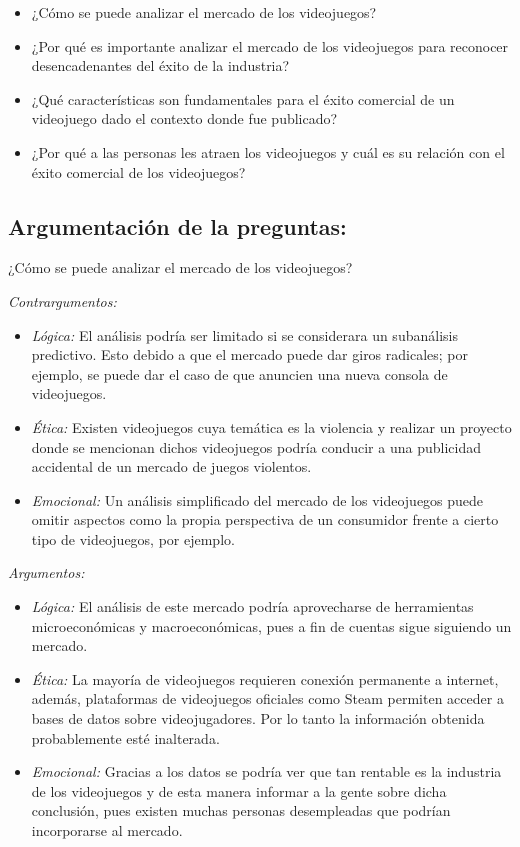 \documentclass[
  letterpaper,
  DIV=11,
  numbers=noendperiod]{scrreprt}
\begin{document}
\begin{itemize}
\item
  ¿Cómo se puede analizar el mercado de los videojuegos?
\item
  ¿Por qué es importante analizar el mercado de los videojuegos para
  reconocer desencadenantes del éxito de la industria?
\item
  ¿Qué características son fundamentales para el éxito comercial de un
  videojuego dado el contexto donde fue publicado?
\item
  ¿Por qué a las personas les atraen los videojuegos y cuál es su
  relación con el éxito comercial de los videojuegos?
\end{itemize}

\hypertarget{argumentaciuxf3n-de-la-preguntas}{%
\subsection{Argumentación de la
preguntas:}\label{argumentaciuxf3n-de-la-preguntas}}

¿Cómo se puede analizar el mercado de los videojuegos?

\emph{Contrargumentos:}

\begin{itemize}
\item
  \emph{Lógica:} El análisis podría ser limitado si se considerara un
  subanálisis predictivo. Esto debido a que el mercado puede dar giros
  radicales; por ejemplo, se puede dar el caso de que anuncien una nueva
  consola de videojuegos.
\item
  \emph{Ética:} Existen videojuegos cuya temática es la violencia y
  realizar un proyecto donde se mencionan dichos videojuegos podría
  conducir a una publicidad accidental de un mercado de juegos
  violentos.
\item
  \emph{Emocional:} Un análisis simplificado del mercado de los
  videojuegos puede omitir aspectos como la propia perspectiva de un
  consumidor frente a cierto tipo de videojuegos, por ejemplo.
\end{itemize}

\emph{Argumentos:}

\begin{itemize}
\item
  \emph{Lógica:} El análisis de este mercado podría aprovecharse de
  herramientas microeconómicas y macroeconómicas, pues a fin de cuentas
  sigue siguiendo un mercado.
\item
  \emph{Ética:} La mayoría de videojuegos requieren conexión permanente
  a internet, además, plataformas de videojuegos oficiales como Steam
  permiten acceder a bases de datos sobre videojugadores. Por lo tanto
  la información obtenida probablemente esté inalterada.
\item
  \emph{Emocional:} Gracias a los datos se podría ver que tan rentable
  es la industria de los videojuegos y de esta manera informar a la
  gente sobre dicha conclusión, pues existen muchas personas
  desempleadas que podrían incorporarse al mercado.
\end{itemize}
\end{document}
